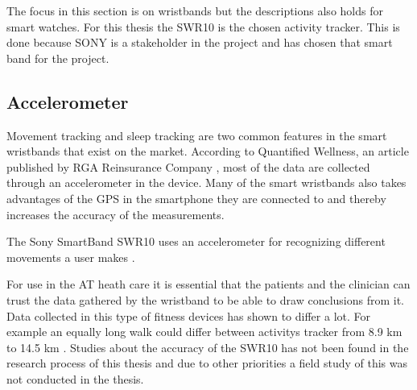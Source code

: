 \documentclass{cslthse-msc}
\begin{document}



The focus in this section is on wristbands but the descriptions also holds for smart watches. For this thesis the SWR10 is the chosen activity tracker. This is done because SONY is a stakeholder in the project and has chosen that smart band for the project.


\subsection{Accelerometer}
Movement tracking and sleep tracking are two common features in the smart wristbands that exist on the market. According to Quantified Wellness, an article published by RGA Reinsurance Company \cite{callaway2015quantified}, most of the data are collected through an accelerometer in the device. Many of the smart wristbands also takes advantages of the GPS in the smartphone they are connected to and thereby increases the accuracy of the measurements. 

The Sony SmartBand SWR10 uses an accelerometer for recognizing different movements a user makes \cite{SWR10}. 


For use in the AT heath care it is essential that the patients and the clinician can trust the data gathered by the wristband to be able to draw conclusions from it. 
Data collected in this type of fitness devices has shown to differ a lot. For example an equally long walk could differ between activitys tracker from 8.9 km to 14.5 km \cite{wearable-technology-cannot-be-trusted}.
Studies about the accuracy of the SWR10 has not been found in the research process of this thesis and due to other priorities a field study of this was not conducted in the thesis.
\end{document}
